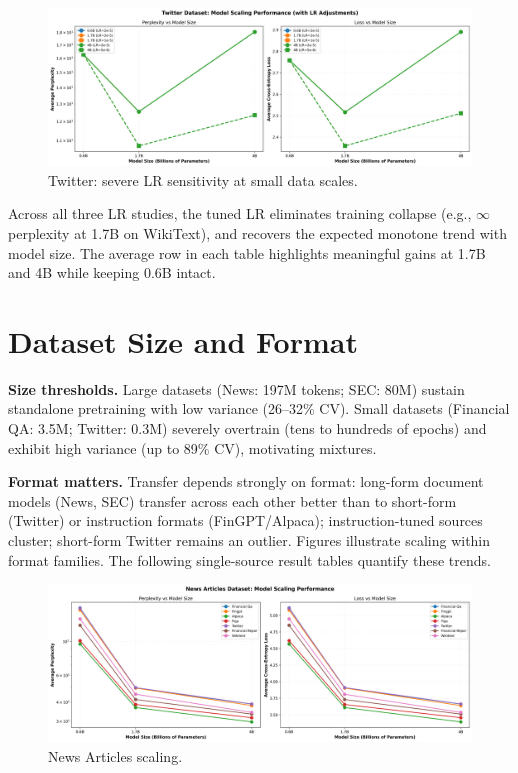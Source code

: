 

\begin{figure}[H]
  \centering
  \includegraphics[width=\textwidth]{../thesis/figures/scaling_twitter.png}
  \caption{Twitter: severe LR sensitivity at small data scales.}\label{fig:scaling_twitter}
\end{figure}



Across all three LR studies, the tuned LR eliminates training collapse (e.g., $\infty$ perplexity at 1.7B on WikiText), and recovers the expected monotone trend with model size. The average row in each table highlights meaningful gains at 1.7B and 4B while keeping 0.6B intact.

\section{Dataset Size and Format}
\textbf{Size thresholds.} Large datasets (News: 197M tokens; SEC: 80M) sustain standalone pretraining with low variance (26--32\% CV). Small datasets (Financial QA: 3.5M; Twitter: 0.3M) severely overtrain (tens to hundreds of epochs) and exhibit high variance (up to 89\% CV), motivating mixtures.

\textbf{Format matters.} Transfer depends strongly on format: long-form document models (News, SEC) transfer across each other better than to short-form (Twitter) or instruction formats (FinGPT/Alpaca); instruction-tuned sources cluster; short-form Twitter remains an outlier. Figures  illustrate scaling within format families. The following single-source result tables quantify these trends.

\begin{figure}[H]
  \centering
  \includegraphics[width=\textwidth]{../thesis/figures/scaling_news_articles.png}
  \caption{News Articles scaling.}\label{fig:scaling_news_articles}
\end{figure}

